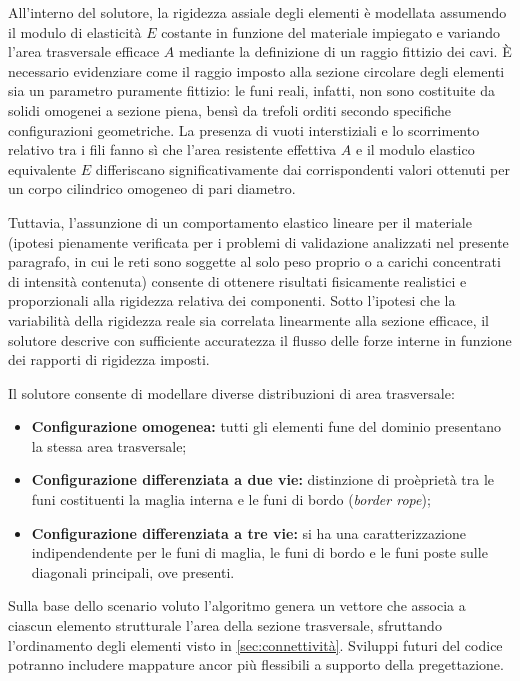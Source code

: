 All'interno del solutore, la rigidezza assiale degli elementi è modellata assumendo il modulo di elasticità $E$ costante in funzione del materiale impiegato e variando l'area trasversale efficace $A$ mediante la definizione di un raggio fittizio dei cavi. \`E necessario evidenziare come il raggio imposto alla sezione circolare degli elementi sia un parametro puramente fittizio: le funi reali, infatti, non sono costituite da solidi omogenei a sezione piena, bensì da trefoli orditi secondo specifiche configurazioni geometriche. La presenza di vuoti interstiziali e lo scorrimento relativo tra i fili fanno sì che l'area resistente effettiva $A$ e il modulo elastico equivalente $E$ differiscano significativamente dai corrispondenti valori ottenuti per un corpo cilindrico omogeneo di pari diametro. 

Tuttavia, l'assunzione di un comportamento elastico lineare per il materiale (ipotesi pienamente verificata per i problemi di validazione analizzati nel presente paragrafo, in cui le reti sono soggette al solo peso proprio o a carichi concentrati di intensità contenuta) consente di ottenere risultati fisicamente realistici e proporzionali alla rigidezza relativa dei componenti. Sotto l'ipotesi che la variabilità della rigidezza reale sia correlata linearmente alla sezione efficace, il solutore descrive con sufficiente accuratezza il flusso delle forze interne in funzione dei rapporti di rigidezza imposti. 

Il solutore consente di modellare diverse distribuzioni di area trasversale:
\begin{itemize}
   \item \textbf{Configurazione omogenea:} tutti gli elementi fune del dominio presentano la stessa area trasversale;
   \item \textbf{Configurazione differenziata a due vie:} distinzione di proèprietà tra le funi costituenti la maglia interna e le funi di bordo (\textit{border rope});
   \item \textbf{Configurazione differenziata a tre vie:} si ha una caratterizzazione indipendendente per le funi di maglia, le funi di bordo e le funi poste sulle diagonali principali, ove presenti. 
\end{itemize}
Sulla base dello scenario voluto l'algoritmo genera un vettore che associa a ciascun elemento strutturale l'area della sezione trasversale, sfruttando l'ordinamento degli elementi visto in \cref{sec:connettività}. Sviluppi futuri del codice potranno includere mappature ancor più flessibili a supporto della pregettazione. 

